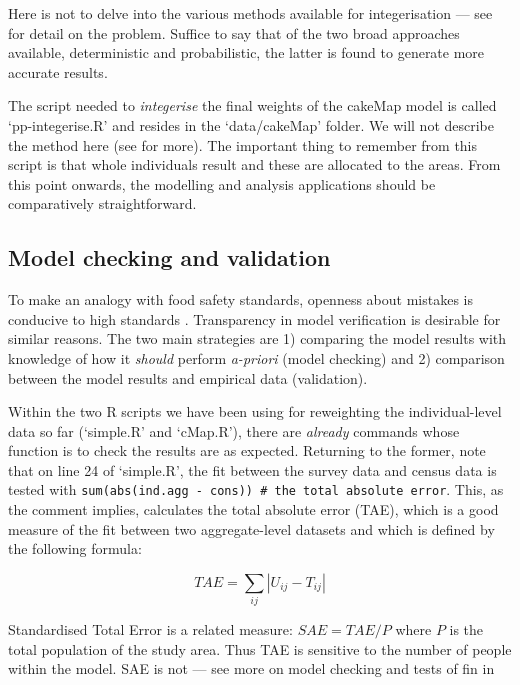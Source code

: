 \documentclass[a4paper, 11pt, twoside]{article}
\begin{document}
Here is not to delve into the various methods available for integerisation ---
see \citep{Lovelace2013-trs} for detail on the problem. Suffice to say that
of the two broad approaches available, deterministic and probabilistic, the latter
is found to generate more accurate results.

The script needed to \emph{integerise} the final weights of the cakeMap model
is called `pp-integerise.R' and resides in the `data/cakeMap' folder.
We will not describe the method here (see \citealp{Lovelace2013-trs} for more).
The important thing to remember from this script is that whole individuals result
and these are allocated to the areas. From this point onwards, the modelling and
analysis applications should be comparatively straightforward.

\subsection{Model checking and validation}
\label{svalid}
To make an analogy with food safety standards, openness about mistakes is
conducive to high standards \citep{Powell2011}. Transparency in model
verification is desirable for similar reasons. The two main strategies are 1) 
comparing the model results with knowledge of how it \emph{should}
perform \emph{a-priori} (model checking) and 2) comparison between the model
results and empirical data (validation).

Within the two R scripts we have been using for reweighting the individual-level
data so far (`simple.R' and `cMap.R'),
there are \emph{already} commands whose function is to check the
results are as expected. Returning to the former, note that on line 24
of `simple.R', the fit between the survey data and census data is
tested with \texttt{sum(abs(ind.agg - cons)) \# the total absolute error}.
This, as the comment implies, calculates the total absolute error
(TAE), which is a good measure of the fit between two aggregate-level
datasets and which is defined by the following formula:

\begin{equation}
 TAE = \sum\limits_{ij}|U_{ij} - T_{ij}|
\end{equation}

Standardised Total Error is a related measure: $SAE = TAE/P$
where $P$ is the total population of the study area.
Thus TAE is sensitive to the number of people
within the model. SAE is not --- see more on model checking and tests of
fin in \citet{Lovelace2013-trs}
\end{document}
